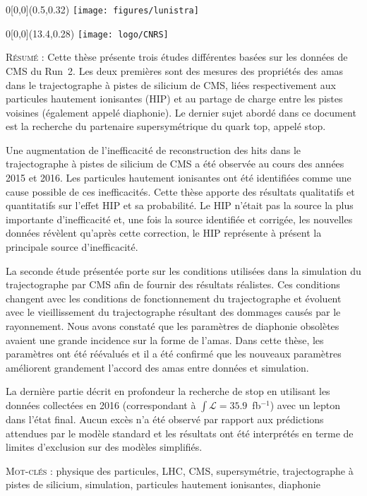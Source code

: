 \begin{textblock}{0}[0,0](0.5,0.32)
{
    \setlength{\fboxsep}{0.7pt}
    \setlength{\fboxrule}{1pt}
    \texttt{[image: figures/lunistra]}
}
\end{textblock}
\begin{textblock}{0}[0,0](13.4,0.28)
{
    \setlength{\fboxsep}{0.7pt}
    \setlength{\fboxrule}{1pt}
    \texttt{[image: logo/CNRS]}
}
\end{textblock}
    \vspace*{-0.7cm}
\small
\begin{framed}
    \vspace*{-0.4cm}
\textsc{Résumé} : Cette thèse présente trois études différentes basées sur les données de CMS du Run~2. Les deux premières sont des mesures des propriétés des amas dans le trajectographe  à pistes de silicium de CMS, liées respectivement aux particules hautement ionisantes (HIP) et au partage de charge entre les pistes voisines (également appelé diaphonie). Le dernier sujet abordé dans ce document est la recherche du partenaire supersymétrique du quark top, appelé stop.

Une augmentation de l'inefficacité de reconstruction des hits dans le trajectographe  à pistes de silicium de CMS a été observée au cours des années 2015 et 2016. Les particules hautement ionisantes ont été identifiées comme une cause possible de ces inefficacités. Cette thèse apporte des résultats qualitatifs et quantitatifs sur l'effet HIP et sa probabilité. Le HIP n'était pas la source la plus importante d’inefficacité et, une fois la source identifiée et corrigée, les nouvelles données révèlent qu’après cette correction, le HIP représente à présent la principale source d’inefficacité.

La seconde étude présentée porte sur les conditions utilisées dans la simulation du trajectographe par CMS afin de fournir des résultats réalistes. Ces conditions changent avec les conditions de fonctionnement du trajectographe et évoluent avec le vieillissement du trajectographe résultant des dommages causés par le rayonnement. Nous avons constaté que les paramètres de diaphonie obsolètes avaient une grande incidence sur la forme de l'amas. Dans cette thèse, les paramètres ont été réévalués et il a été confirmé que les nouveaux paramètres améliorent grandement l’accord des amas entre données et simulation.

La dernière partie décrit en profondeur la recherche de stop en utilisant les données  collectées en 2016 (correspondant à $ \int{\mathcal{L}} = 35.9 $~fb$^{-1} $) avec un lepton dans l'état final. Aucun excès n'a été observé par rapport aux prédictions  attendues par le modèle standard et les résultats ont été interprétés en terme de limites d'exclusion sur des modèles simplifiés.

    \textsc{Mot-clés} : physique des particules, LHC, CMS, supersymétrie, trajectographe à pistes de silicium, simulation, particules hautement ionisantes, diaphonie
\end{framed}
